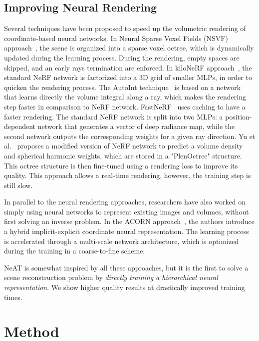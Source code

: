 \documentclass[acmtog,nonacm]{acmart} \acmSubmissionID{0438}
\newcommand{\neat}{NeAT\xspace}
\begin{document}
\subsection{Improving Neural Rendering}
Several techniques have been proposed to speed up the volumetric
rendering of coordinate-based neural networks. In Neural Sparse Voxel
Fields (NSVF) approach~\cite{liu2020neural}, the scene is organized
into a sparse voxel octree, which is dynamically updated during the
learning process. During the rendering, empty spaces are skipped, and an
early rays termination are enforced. In kiloNeRF
approach~\cite{reiser2021kilonerf}, the standard NeRF network is
factorized into a 3D grid of smaller MLPs, in order to quicken the
rendering process. The AutoInt technique~\cite{lindell2021autoint} is
based on a network that learns directly the volume integral along a
ray, which makes the rendering step faster in comparison to NeRF
network. FastNeRF~\cite{garbin2021fastnerf} uses caching to have a
faster rendering. The standard NeRF network is split into two MLPs: a
position-dependent network that generates a vector of deep radiance
map, while the second network outputs the corresponding weights for a
given ray direction. Yu et al.~ proposes
a modified version of NeRF network to predict a volume density and
spherical harmonic weights, which are stored in a "PlenOctree"
structure. This octree structure is then fine-tuned using a rendering
loss to improve its quality. This approach allows a real-time
rendering, however, the training step is still slow.

In parallel to the neural rendering approaches, researchers have also
worked on simply using neural networks to represent existing images
and volumes, without first solving an inverse problem. In the ACORN
approach~\cite{martel2021acorn}, the authors introduce a hybrid
implicit-explicit coordinate neural representation. The learning
process is accelerated through a multi-scale network architecture,
which is optimized during the training in a coarse-to-fine scheme.

\neat is somewhat inspired by all these approaches, but it is the
first to solve a scene reconstruction problem by {\em directly
training a hierarchical neural representation}. We show higher quality
results at drastically improved training times.






 


\section{Method}
\end{document}
